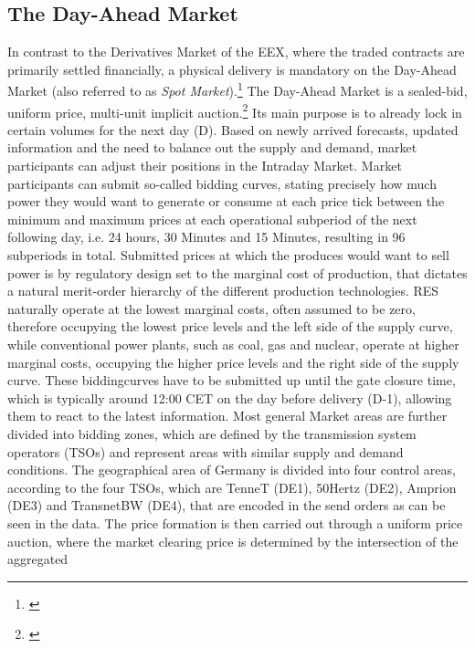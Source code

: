 \documentclass[12pt,a4paper]{cau_thesis}
\begin{document}
\subsection{The Day-Ahead Market}\label{sub_sec:day_ahead_market}
In contrast to the Derivatives Market of the EEX, where the traded
contracts are primarily settled financially, a physical delivery is
mandatory on the Day-Ahead Market (also referred to as \textit{Spot
    Market}).\footnote{\cite[See ][, p.
        136]{bnetza_monitoringreport_energy_2025}} The Day-Ahead Market is a
sealed-bid, uniform price, multi-unit implicit
auction.\footnote{\cite[See ][, p.233]{balardy2022empirical}} Its
main purpose is to already lock in certain volumes for the next day
(D). Based on newly arrived forecasts, updated information and the
need to balance out the supply and demand, market participants can
adjust their positions in the Intraday Market. Market participants
can submit so-called bidding curves, stating precisely how much power
they would want to generate or consume at each price tick between the
minimum and maximum prices at each operational subperiod of the next
following day, i.e. 24 hours, 30 Minutes and 15 Minutes, resulting in
96 subperiods in total. Submitted prices at which the produces would
want to sell power is by regulatory design set to the marginal cost
of production, that dictates a natural merit-order hierarchy of the
different production technologies. RES naturally operate at the
lowest marginal costs, often assumed to be zero, therefore occupying
the lowest price levels and the left side of the supply curve, while
conventional power plants, such as coal, gas and nuclear, operate at
higher marginal costs, occupying the higher price levels and the
right side of the supply curve. These biddingcurves have to be
submitted up until the gate closure time, which is typically around
12:00 CET on the day before delivery (D-1), allowing them to react to
the latest information. Most general Market areas are further divided
into bidding zones, which are defined by the transmission system
operators (TSOs) and represent areas with similar supply and demand
conditions. The geographical area of Germany is divided into four
control areas, according to the four TSOs, which are TenneT (DE1),
50Hertz (DE2), Amprion (DE3) and TransnetBW (DE4), that are encoded
in the send orders as can be seen in the data. The price formation is
then carried out through a uniform price auction, where the market
clearing price is determined by the intersection of the aggregated
\end{document}
